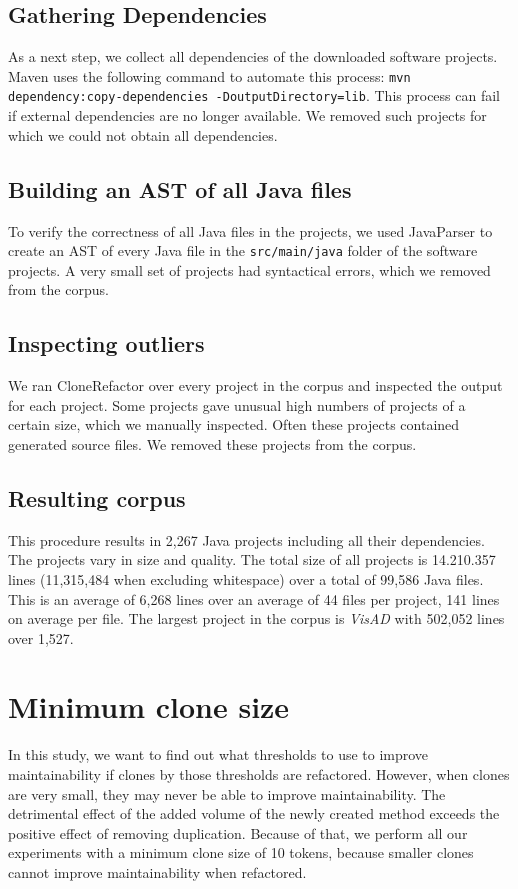 \subsection{Gathering Dependencies}
As a next step, we collect all dependencies of the downloaded software projects. Maven uses the following command to automate this process: \texttt{mvn dependency:copy-dependencies -DoutputDirectory=lib}. This process can fail if external dependencies are no longer available. We removed such projects for which we could not obtain all dependencies.

\subsection{Building an AST of all Java files}
To verify the correctness of all Java files in the projects, we used JavaParser \cite{tomassetti2017javaparser} to create an AST of every Java file in the \texttt{src/main/java} folder of the software projects. A very small set of projects had syntactical errors, which we removed from the corpus.

\subsection{Inspecting outliers}
We ran CloneRefactor over every project in the corpus and inspected the output for each project. Some projects gave unusual high numbers of projects of a certain size, which we manually inspected. Often these projects contained generated source files. We removed these projects from the corpus.

\subsection{Resulting corpus}
This procedure results in 2,267 Java projects including all their dependencies. The projects vary in size and quality. The total size of all projects is 14.210.357 lines (11,315,484 when excluding whitespace) over a total of 99,586 Java files. This is an average of 6,268 lines over an average of 44 files per project, 141 lines on average per file. The largest project in the corpus is \textit{VisAD} with 502,052 lines over 1,527.

\section{Minimum clone size}
In this study, we want to find out what thresholds to use to improve maintainability if clones by those thresholds are refactored. However, when clones are very small, they may never be able to improve maintainability. The detrimental effect of the added volume of the newly created method exceeds the positive effect of removing duplication. Because of that, we perform all our experiments with a minimum clone size of 10 tokens, because smaller clones cannot improve maintainability when refactored.

